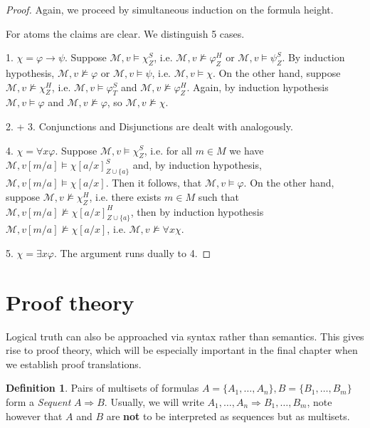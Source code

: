 \documentclass[a4paper,11pt]{report}
\theoremstyle{definition}
\theoremstyle{definition}
\theoremstyle{definition}
\theoremstyle{definition}
\theoremstyle{definition}
\newtheorem{definition}[theorem]{Definition}
\theoremstyle{definition}
\theoremstyle{definition}
\begin{document}
	\begin{proof}
		Again, we proceed by simultaneous induction on the formula height.
		
		For atoms the claims are clear. We distinguish 5 cases.
		
		1. $\chi = \varphi\to\psi$. Suppose $\mathcal M, v\models\chi^S_Z$, i.e. $\mathcal M, v\not\models\varphi^H_Z$ or $\mathcal M, v\models\psi^S_Z$. By induction hypothesis, $\mathcal M, v\not\models \varphi$ or $\mathcal M, v\models\psi$, i.e. $\mathcal M, v\models \chi$. On the other hand, suppose $\mathcal M, v\not\models\chi^H_Z$, i.e. $\mathcal M, v\models\varphi^S_T$ and $\mathcal M, v\not\models\varphi^H_Z$. Again, by induction hypothesis $\mathcal M,v\models\varphi$ and $\mathcal M, v\not\models \varphi$, so $\mathcal M, v\not\models\chi$.
		
		2. + 3. Conjunctions and Disjunctions are dealt with analogously.
		
		4. $\chi = \forall x\varphi$.  Suppose $\mathcal M, v\models\chi^S_Z$, i.e. for all $m\in M$ we have $\mathcal M, v[m/a]\models \chi[a/x]^S_{Z\cup\{a\}}$ and, by induction hypothesis, $\mathcal M, v[m/a]\models \chi[a/x]$. Then it follows, that $\mathcal M, v\models\varphi$. On the other hand, suppose $\mathcal M, v\not\models\chi^H_Z$, i.e. there exists $m\in M$ such that $\mathcal M, v[m/a]\not\models\chi[a/x]^H_{Z\cup \{a\}}$, then by induction hypothesis $\mathcal M, v[m/a]\not\models \chi[a/x]$, i.e. $\mathcal M, v\not\models\forall x\chi$.
		
		5. $\chi = \exists x\varphi$. The argument runs dually to 4.
	\end{proof}
	
	\section{Proof theory}\label{proof-theory}
	
	Logical truth can also be approached via syntax rather than semantics. This gives rise to proof theory, which will be especially important in the final chapter when we establish proof translations.
		
	\begin{definition}
		Pairs of multisets of formulas $A = \{A_1,\dots, A_n\}, B = \{B_1,\dots, B_m\}$ form a \textit{Sequent} $A\Rightarrow B$. Usually, we will write $A_1,\dots, A_n\Rightarrow B_1,\dots, B_m$, note however that $A$ and $B$ are \textbf{not} to be interpreted as sequences but as multisets.
	\end{definition}
	
\end{document}
